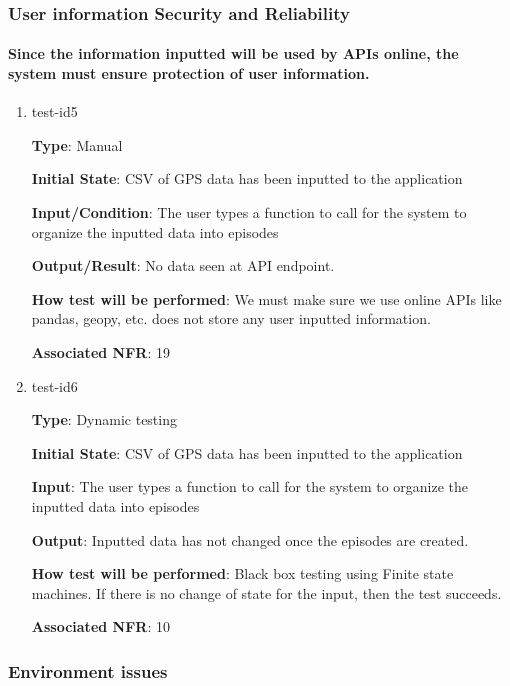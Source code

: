 \documentclass[12pt, titlepage]{article}
\begin{document}
\subsubsection{User information Security and Reliability}
		
\paragraph{Since the information inputted will be used by APIs online, the system must ensure protection of user information.}

\begin{enumerate}

\item{test-id5\\}

\textbf{Type}: Manual
					
\textbf{Initial State}: CSV of GPS data has been inputted to the application
					
\textbf{Input/Condition}: The user types a function to call for the system to organize the
inputted data into episodes
					
\textbf{Output/Result}: No data seen at API endpoint.
					
\textbf{How test will be performed}: We must make sure we use online APIs like pandas, geopy, etc. does not store any user inputted information.

\textbf{Associated NFR}: 19

\item{test-id6\\}

\textbf{Type}: Dynamic testing
					
\textbf{Initial State}: CSV of GPS data has been inputted to the application
					
\textbf{Input}: The user types a function to call for the system to organize the
inputted data into episodes
					
\textbf{Output}: Inputted data has not changed once the episodes are created.
					
\textbf{How test will be performed}: Black box testing using Finite state machines. If there is no change of state for the input, then the test succeeds. 

\textbf{Associated NFR}: 10

\end{enumerate}

\subsubsection{Environment issues}
		
\end{document}
